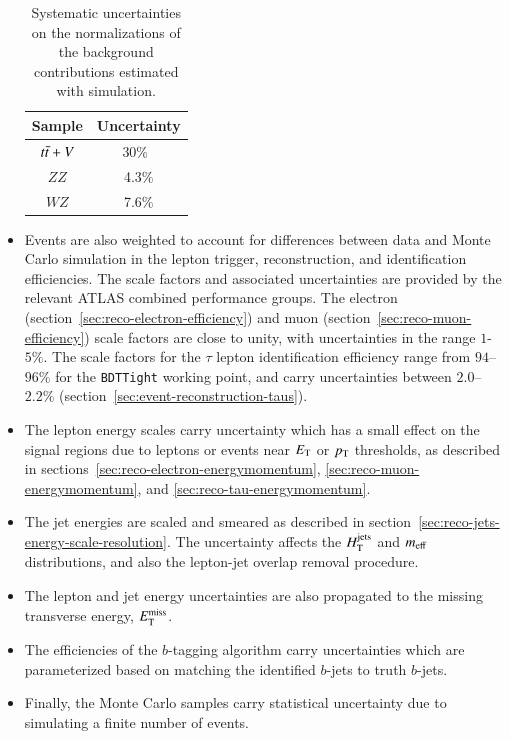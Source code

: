 \begin{itemize}
  \begin{table}
    \begin{center}
      \begin{tabular}{c c}
        \hline
        Sample     &Uncertainty\\
        \hline
        $t\bar{t}+V$ &30\%~\cite{Garzelli:2012gx,Campbell:2012en} \\
        $ZZ$       &4.3\% \\
        $WZ$       &7.6\%\\
        \hline
      \end{tabular}
      \caption{Systematic uncertainties on the normalizations of the background contributions estimated with simulation.}
      \label{table:model-independent-cross-section-uncertainties}
    \end{center}
  \end{table}

	\item Events are also weighted to account for differences between data and Monte Carlo simulation in the lepton trigger, reconstruction, and identification efficiencies. The scale factors and associated uncertainties are provided by the relevant ATLAS combined performance groups. The electron (section~\ref{sec:reco-electron-efficiency}) and muon (section~\ref{sec:reco-muon-efficiency}) scale factors are close to unity, with uncertainties in the range $1$-$5\%$. The scale factors for the $\tau$ lepton identification efficiency range from $94$--$96\%$ for the \texttt{BDTTight} working point, and carry uncertainties between $2.0$--$2.2\%$ (section~\ref{sec:event-reconstruction-taus}).

	\item The lepton energy scales carry uncertainty which has a small effect on the signal regions due to leptons or events near $E_{\mathrm{T}}$ or $p_{\text{T}}$ thresholds, as described in sections~\ref{sec:reco-electron-energymomentum}, \ref{sec:reco-muon-energymomentum}, and \ref{sec:reco-tau-energymomentum}.

	\item  The jet energies are scaled and smeared as described in section~\ref{sec:reco-jets-energy-scale-resolution}. The uncertainty affects the $H_{\mathrm{T}}^{\mathrm{jets}}$ and $m_{\mathrm{eff}}$ distributions, and also the lepton-jet overlap removal procedure.

	\item The lepton and jet energy uncertainties are also propagated to the missing transverse energy, $E_{\text{T}}^{\text{miss}}$. 

	\item The efficiencies of the $b$-tagging algorithm carry uncertainties which are parameterized based on matching the identified $b$-jets to truth $b$-jets.

	\item Finally, the Monte Carlo samples carry statistical uncertainty due to simulating a finite number of events. 
\end{itemize}

